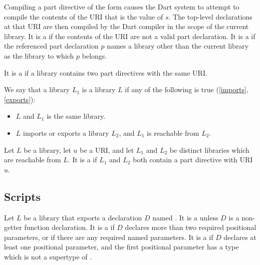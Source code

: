 \documentclass[makeidx]{article}
\begin{document}
{\LMHash{}%
Compiling a part directive of the form 
causes the Dart system to attempt to compile the contents of
the URI that is the value of $s$.
The top-level declarations at that URI are then compiled by the Dart compiler
in the scope of the current library.
It is a  if the contents of the URI are not
a valid part declaration.
It is a  if the referenced part declaration $p$ names
a library other than the current library as the library to which $p$ belongs.

\LMHash{}%
It is a  if a library contains
two part directives with the same URI.

\LMHash{}%
We say that a library $L_1$ is  a library $L$ if
any of the following is true (\ref{imports}, \ref{exports}):
\begin{itemize}
\item $L$ and $L_1$ is the same library.
\item $L$ imports or exports a library $L_2$, and $L_1$ is reachable from $L_2$.
\end{itemize}

\LMHash{}%
Let $L$ be a library, let $u$ be a URI,
and let $L_1$ and $L_2$ be distinct libraries which are reachable from $L$.
It is a  if $L_1$ and $L_2$ both contain
a part directive with URI $u$.



\subsection{Scripts}

\LMHash{}%
Let $L$ be a library that exports a declaration $D$ named .
It is a  unless $D$ is
a non-getter function declaration.
It is a  if $D$ declares
more than two required positional parameters,
or if there are any required named parameters.
It is a  if $D$ declares
at least one positional parameter,
and the first positional parameter has a type which is
not a supertype of .

}
\end{document}
